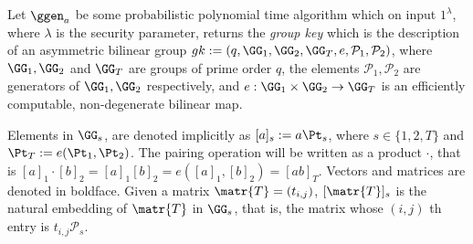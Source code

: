 Let $\ggen_a$ be some probabilistic polynomial time algorithm which on input $1^{\lambda}$, where $\lambda$ is the security parameter, returns the \emph{group key} which is the description of an asymmetric bilinear group $gk:=(q,\GG_1,\GG_2,\GG_T,e,\mathcal{P}_1,\mathcal{P}_2)$, where $\GG_1,\GG_2$
and $\GG_T$ are groups of prime order $q$, the elements $\mathcal{P}_1, \mathcal{P}_2$ are generators of 
$\GG_1,\GG_2$ respectively, and $e:\GG_1\times\GG_2\to\GG_T$ is an efficiently
computable, non-degenerate bilinear map. 

Elements in $\GG_s$, are denoted implicitly as $[a]_s:=a \Pt_s$, where $s \in \{1,2,T\}$ and $\Pt_T:=e(\Pt_1,\Pt_2)$. 
The pairing operation will be written as a product $\cdot$, that is $[a]_1 \cdot [b]_2=[a]_1 [b]_2=e([a]_1,[b]_2)=[ab]_T$. Vectors and matrices are denoted in boldface. Given a matrix $\matr{T}=(t_{i,j})$, $[\matr{T}]_s$ is
the natural embedding of $\matr{T}$ in $\GG_s$, that is, the matrix whose $(i,j)$ th entry
is $t_{i,j}\mathcal{P}_s$.